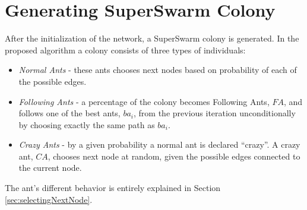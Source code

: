 \section{Generating SuperSwarm Colony}
\label{sec:algoGeneratingSuperSwarm}
After the initialization of the network, a SuperSwarm colony is generated. In the proposed algorithm a colony consists of three types of individuals:
\begin{itemize}
\item \textit{Normal Ants} - these ants chooses next nodes based on probability of each of the possible edges. 
\item \textit{Following Ants} - a percentage of the colony becomes Following Ants, $FA$, and follows one of the best ants, $ba_i$, from the previous iteration unconditionally by choosing exactly the same path as $ba_i$.
\item \textit{Crazy Ants} - by a given probability a normal ant is declared ``crazy''. A crazy ant, $CA$, chooses next node at random, given the possible edges connected to the current node.  
\end{itemize}

The ant's different behavior is entirely explained in Section \vref{sec:selectingNextNode}.
